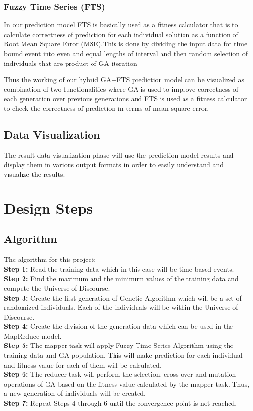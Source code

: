 \documentclass[12pt,journal,compsoc]{IEEEtran}
\begin{document}
\subsubsection{ Fuzzy Time Series (FTS)}
 In our prediction model FTS is basically used as a fitness calculator that is to calculate correctness of prediction for each individual solution as a function of Root Mean Square Error (MSE).This is done by dividing the input data for time bound event into even and equal lengths of interval and then random selection of individuals that are product of GA iteration.
 
Thus the working of our hybrid GA+FTS prediction model can be visualized as combination of two functionalities where GA is used to improve correctness of each generation over previous generations and FTS is used as a fitness calculator to check the correctness of prediction in terms of mean square error.
 

\subsection{Data Visualization}
The result data visualization phase will use the prediction model results and display them in various output formats in order to easily understand and visualize the results. 

\section{Design Steps}
\subsection{Algorithm}


The algorithm for this project: 
\\\indent \textbf{Step 1:} Read the training data which in this case will be time based events.
\\\indent \textbf{Step 2:} Find the maximum and the minimum values of the training data and compute the Universe of Discourse.
\\\indent \textbf{Step 3:} Create the first generation of Genetic Algorithm which will be a set of randomized individuals. Each of the individuals will be within the Universe of Discourse.
\\\indent \textbf{Step 4:} Create the division of the generation data which can be used in the MapReduce model. 
\\\indent \textbf{Step 5:} The mapper task will apply Fuzzy Time Series Algorithm using the training data and GA population. This will make prediction for each individual and fitness value for each of them will be calculated.
\\\indent \textbf{Step 6:} The reducer task will perform the selection, cross-over and mutation operations of GA based on the fitness value calculated by the mapper task. Thus, a new generation of individuals will be created.
\\\indent \textbf{Step 7:} Repeat Steps 4 through 6 until the convergence point is not reached.
\end{document}
